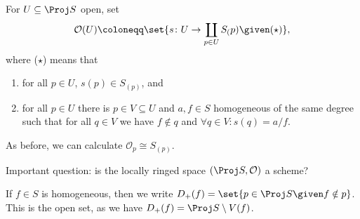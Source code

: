For $U \subseteq \Proj S$ open, set
\[ \mathcal{O}(U)\coloneqq \set{s\colon U\to \coprod_{p \in U} S_(p)\given (\star)}, \]
where ($\star$) means that
\begin{enumerate}
	\item for all  $p \in U$, $s(p) \in S_(p)$, and
	\item for all $p \in U$ there is $p \in V \subseteq U$ and $a, f \in S$ homogeneous
		of the same degree such that for all $q \in V$ we have $f \notin q$
		and $\forall q \in V\colon s(q) = a/f$.
\end{enumerate}

As before, we can calculate $\mathcal{O}_p \cong S_{(p)}$.

Important question: is the locally ringed space $(\Proj S, \mathcal{O})$ a
scheme?

If $f \in S$ is homogeneous, then we write $D_+(f) = \set{p \in \Proj S\given f\notin p}$.
This is the open set, as we have $D_+(f) = \Proj S\setminus V(f)$.
